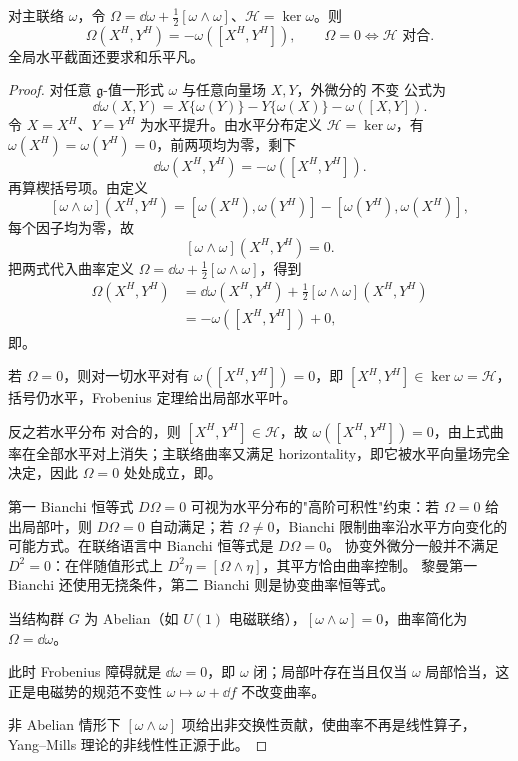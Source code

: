 \begin{proposition}[主联络曲率与水平可积性]
对主联络 $\omega$，令 $\Omega=\dd\omega+\frac12[\omega\wedge\omega]$、$\mathcal H=\ker\omega$。则\[\Omega(X^H,Y^H)=-\omega([X^H,Y^H]),\qquad\Omega=0\Longleftrightarrow\mathcal H\text{ 对合}.\]全局水平截面还要求和乐平凡。
\end{proposition}

\begin{proof}
对任意 $\mathfrak g$-值一形式 $\omega$ 与任意向量场 $X,Y$，外微分的 不变 公式为
\[
 \dd\omega(X,Y)
 =X\{\omega(Y)\}-Y\{\omega(X)\}-\omega([X,Y]).
\]
令 $X=X^H$、$Y=Y^H$ 为水平提升。由水平分布定义 $\mathcal H=\ker\omega$，有 $\omega(X^H)=\omega(Y^H)=0$，前两项均为零，剩下
\[
 \dd\omega(X^H,Y^H)=-\omega([X^H,Y^H]).
\]
再算楔括号项。由定义
\[
 [\omega\wedge\omega](X^H,Y^H)
 =[\omega(X^H),\omega(Y^H)]-[\omega(Y^H),\omega(X^H)],
\]
每个因子均为零，故
\[
 [\omega\wedge\omega](X^H,Y^H)=0.
\]
把两式代入曲率定义 $\Omega=\dd\omega+\tfrac12[\omega\wedge\omega]$，得到
\begin{align*}
\Omega(X^H,Y^H)
&=\dd\omega(X^H,Y^H)+\tfrac12[\omega\wedge\omega](X^H,Y^H)\\
&=-\omega([X^H,Y^H])+0,
\end{align*}
即。

若 $\Omega=0$，则对一切水平对有 $\omega([X^H,Y^H])=0$，即 $[X^H,Y^H]\in\ker\omega=\mathcal H$，括号仍水平，Frobenius 定理给出局部水平叶。

反之若水平分布 对合的，则 $[X^H,Y^H]\in\mathcal H$，故 $\omega([X^H,Y^H])=0$，由上式曲率在全部水平对上消失；主联络曲率又满足 horizontality，即它被水平向量场完全决定，因此 $\Omega=0$ 处处成立，即。

第一 Bianchi 恒等式 $D\Omega=0$ 可视为水平分布的"高阶可积性"约束：若 $\Omega=0$ 给出局部叶，则 $D\Omega=0$ 自动满足；若 $\Omega\neq0$，Bianchi 限制曲率沿水平方向变化的可能方式。在联络语言中 Bianchi 恒等式是 $D\Omega=0$。
协变外微分一般并不满足 $D^2=0$：在伴随值形式上
$D^2\eta=[\Omega\wedge\eta]$，其平方恰由曲率控制。
黎曼第一 Bianchi 还使用无挠条件，第二 Bianchi 则是协变曲率恒等式。

当结构群 $G$ 为 Abelian（如 $U(1)$ 电磁联络），$[\omega\wedge\omega]=0$，曲率简化为 $\Omega=\dd\omega$。

此时 Frobenius 障碍就是 $\dd\omega=0$，即 $\omega$ 闭；局部叶存在当且仅当 $\omega$ 局部恰当，这正是电磁势的规范不变性 $\omega\mapsto\omega+\dd f$ 不改变曲率。

非 Abelian 情形下 $[\omega\wedge\omega]$ 项给出非交换性贡献，使曲率不再是线性算子，Yang--Mills 理论的非线性性正源于此。


\end{proof}
